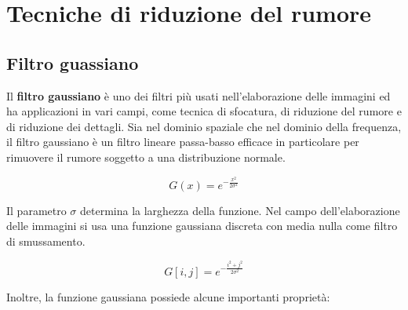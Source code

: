 \documentclass[../main.tex]{subfiles}
\begin{document}
\section{Tecniche di riduzione del rumore}

\subsection{Filtro guassiano}

Il \textbf{filtro gaussiano} è uno dei filtri più usati nell'elaborazione delle immagini ed ha applicazioni in vari campi, come tecnica di sfocatura, di riduzione del rumore e di riduzione dei dettagli. Sia nel dominio spaziale che nel dominio della frequenza, il filtro gaussiano è un filtro lineare passa-basso efficace in particolare per rimuovere il rumore soggetto a una distribuzione normale.

\begin{equation}
	G(x) = e^{-\frac{x^2}{2\sigma^2}}
\end{equation}

Il parametro $\sigma$ determina la larghezza della funzione. Nel campo dell'elaborazione delle immagini si usa una funzione gaussiana discreta con media nulla come filtro di smussamento.\cite{ito_2000}

\begin{equation}
	G[i,j] = e^{-\frac{i^2+j^2}{2\sigma^2}}
\end{equation}

Inoltre, la funzione gaussiana possiede alcune importanti proprietà: \cite{wang_2014,getreuer_2013}
\end{document}
